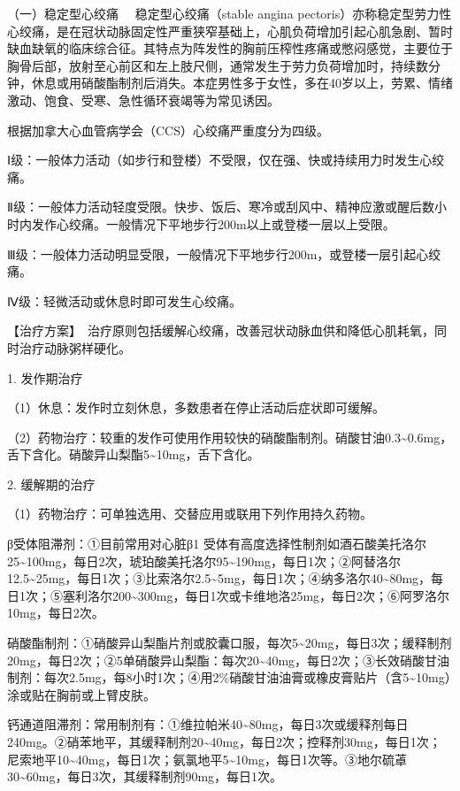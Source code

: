 {（一）稳定型心绞痛} 　稳定型心绞痛（stable angina
pectoris）亦称稳定型劳力性心绞痛，是在冠状动脉固定性严重狭窄基础上，心肌负荷增加引起心肌急剧、暂时缺血缺氧的临床综合征。其特点为阵发性的胸前压榨性疼痛或憋闷感觉，主要位于胸骨后部，放射至心前区和左上肢尺侧，通常发生于劳力负荷增加时，持续数分钟，休息或用硝酸酯制剂后消失。本症男性多于女性，多在40岁以上，劳累、情绪激动、饱食、受寒、急性循环衰竭等为常见诱因。

根据加拿大心血管病学会（CCS）心绞痛严重度分为四级。

Ⅰ级：一般体力活动（如步行和登楼）不受限，仅在强、快或持续用力时发生心绞痛。

Ⅱ级：一般体力活动轻度受限。快步、饭后、寒冷或刮风中、精神应激或醒后数小时内发作心绞痛。一般情况下平地步行200m以上或登楼一层以上受限。

Ⅲ级：一般体力活动明显受限，一般情况下平地步行200m，或登楼一层引起心绞痛。

Ⅳ级：轻微活动或休息时即可发生心绞痛。

【治疗方案】　治疗原则包括缓解心绞痛，改善冠状动脉血供和降低心肌耗氧，同时治疗动脉粥样硬化。

1. 发作期治疗

（1）休息：发作时立刻休息，多数患者在停止活动后症状即可缓解。

（2）药物治疗：较重的发作可使用作用较快的硝酸酯制剂。硝酸甘油0.3\textasciitilde{}0.6mg，舌下含化。硝酸异山梨酯5\textasciitilde{}10mg，舌下含化。

2. 缓解期的治疗

（1）药物治疗：可单独选用、交替应用或联用下列作用持久药物。

β受体阻滞剂：①目前常用对心脏β{1}
受体有高度选择性制剂如酒石酸美托洛尔25\textasciitilde{}100mg，每日2次，琥珀酸美托洛尔95\textasciitilde{}190mg，每日1次；②阿替洛尔12.5\textasciitilde{}25mg，每日1次；③比索洛尔2.5\textasciitilde{}5mg，每日1次；④纳多洛尔40\textasciitilde{}80mg，每日1次；⑤塞利洛尔200\textasciitilde{}300mg，每日1次或卡维地洛25mg，每日2次；⑥阿罗洛尔10mg，每日2次。

硝酸酯制剂：①硝酸异山梨酯片剂或胶囊口服，每次5\textasciitilde{}20mg，每日3次；缓释制剂20mg，每日2次；②5单硝酸异山梨酯：每次20\textasciitilde{}40mg，每日2次；③长效硝酸甘油制剂：每次2.5mg，每8小时1次；④用2\%硝酸甘油油膏或橡皮膏贴片（含5\textasciitilde{}10mg）涂或贴在胸前或上臂皮肤。

钙通道阻滞剂：常用制剂有：①维拉帕米40\textasciitilde{}80mg，每日3次或缓释剂每日240mg。②硝苯地平，其缓释制剂20\textasciitilde{}40mg，每日2次；控释剂30mg，每日1次；尼索地平10\textasciitilde{}40mg，每日1次；氨氯地平5\textasciitilde{}10mg，每日1次等。③地尔硫䓬
30\textasciitilde{}60mg，每日3次，其缓释制剂90mg，每日1次。

